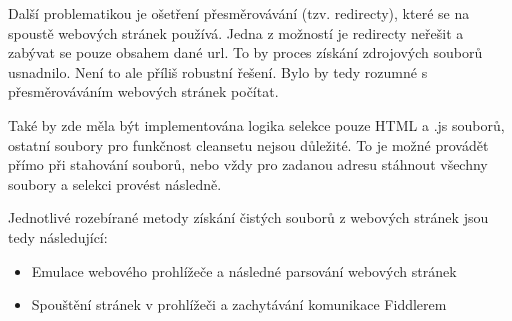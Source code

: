\documentclass[thesis=M,czech,hidelinks]{FITthesis}[2013/05/06]
\begin{document}
Další problematikou je ošetření přesměrovávání (tzv. redirecty), které se na spoustě webových stránek používá. Jedna z možností je redirecty neřešit a zabývat se pouze obsahem dané url. To by proces získání zdrojových souborů usnadnilo. Není to ale příliš robustní řešení. Bylo by tedy rozumné s přesměrováváním webových stránek počítat. 

Také by zde měla být implementována logika selekce pouze HTML a .js souborů, ostatní soubory pro funkčnost cleansetu nejsou důležité. To je možné provádět přímo při stahování souborů, nebo vždy pro zadanou adresu stáhnout všechny soubory a selekci provést následně.

Jednotlivé rozebírané metody získání čistých souborů z webových stránek jsou tedy následující:
\begin{itemize}
	\item Emulace webového prohlížeče a následné parsování webových stránek 
	\item Spouštění stránek v prohlížeči a zachytávání komunikace Fiddlerem
\end{itemize}
\end{document}
